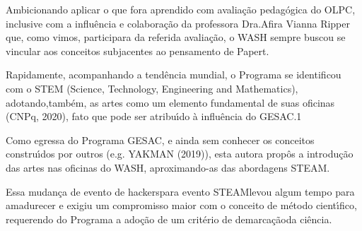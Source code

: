 \documentclass[
12pt,		%
openright,	%
twoside,  %
a4paper,			%
chapter=TITLE,		%
english,			%
french,				%
spanish,			%
brazil				%
]{USPSC-classe/USPSC}
\begin{document}
\noindent\begin{center}\mbox{\centering{}}\end{center}


Ambicionando aplicar o que fora aprendido com avalia\c{c}\~ao pedag\'ogica do OLPC, inclusive com a influ\^encia e colabora\c{c}\~ao da professora Dra.Afira Vianna Ripper que, como vimos, participara da referida avalia\c{c}\~ao, o WASH sempre buscou se vincular aos conceitos subjacentes ao pensamento de Papert.

















Rapidamente, acompanhando a tend\^encia mundial, o Programa se identificou com o STEM (Science, Technology, Engineering and Mathematics), adotando,tamb\'em, as artes como um elemento fundamental de suas oficinas  (CNPq, 2020), fato que pode ser atribu\'{\i}do \`a influ\^encia do GESAC.1

















Como egressa do Programa GESAC, e ainda sem conhecer os conceitos constru\'{\i}dos por outros (e.g.  YAKMAN (2019)), esta autora prop\^os a introdu\c{c}\~ao das artes nas oficinas do WASH, aproximando-as das abordagens STEAM.

















Essa mudan\c{c}a de \textquotedbl evento de hackers\textquotedbl  para \textquotedbl evento STEAM\textquotedbl  levou algum tempo para amadurecer e exigiu um compromisso maior com o conceito de m\'etodo cient\'{\i}fico, requerendo do Programa a ado\c{c}\~ao de um \textquotedbl crit\'erio de demarca\c{c}\~ao\textquotedbl  da ci\^encia.
\end{document}
